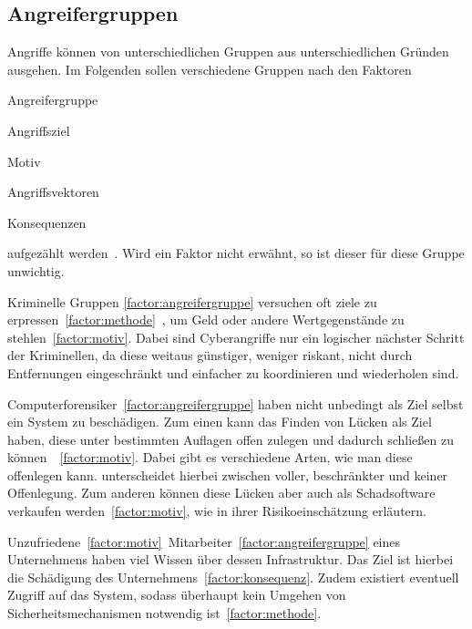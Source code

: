 \documentclass[final,bibliography=totocnumbered]{include/sikseminar}
\begin{document}


    \subsection{Angreifergruppen}
    \label{subsec:angreifergruppen}

    Angriffe können von unterschiedlichen Gruppen aus unterschiedlichen Gründen ausgehen.
    Im Folgenden sollen verschiedene Gruppen nach den Faktoren
    \begin{enumerate*}[label=(\alph*),before=\unskip{: }, itemjoin={{; }}, itemjoin*={{, und }}]
        \item Angreifergruppe\label{factor:angreifergruppe}
        \item Angriffsziel\label{factor:target}
        \item Motiv\label{factor:motiv}
        \item Angriffsvektoren\label{factor:methode}
        \item Konsequenzen\label{factor:konsequenz}
    \end{enumerate*} aufgezählt werden~\cite{HLL+17}.
    Wird ein Faktor nicht erwähnt, so ist dieser für diese Gruppe unwichtig.

    Kriminelle Gruppen \ref{factor:angreifergruppe} versuchen oft ziele zu erpressen~\ref{factor:methode}~\cite{WYX+10}, um Geld oder andere Wertgegenstände zu stehlen~\ref{factor:motiv}.
    Dabei sind Cyberangriffe nur ein logischer nächster Schritt der Kriminellen, da diese weitaus günstiger, weniger riskant, nicht durch Entfernungen eingeschränkt und einfacher zu koordinieren und wiederholen sind. \cite{CAS+09}

    Computerforensiker~\ref{factor:angreifergruppe} haben nicht unbedingt als Ziel selbst ein System zu beschädigen.
    Zum einen kann das Finden von Lücken als Ziel haben, diese unter bestimmten Auflagen offen zulegen und dadurch schließen zu können~\cite{Hahn2012}~\ref{factor:motiv}.
    Dabei gibt es verschiedene Arten, wie man diese offenlegen kann. \citeauthor{Hahn2012} unterscheidet hierbei zwischen voller, beschränkter und keiner Offenlegung.
    Zum anderen können diese Lücken aber auch als Schadsoftware verkaufen werden~\ref{factor:motiv}, wie \citeauthor{Allodi2013} in ihrer Risikoeinschätzung \cite{Allodi2013} erläutern.

    Unzufriedene~\ref{factor:motiv}~Mitarbeiter~\ref{factor:angreifergruppe} eines Unternehmens haben viel Wissen über dessen Infrastruktur.
    Das Ziel ist hierbei die Schädigung des Unternehmens~\ref{factor:konsequenz}.
    Zudem existiert eventuell Zugriff auf das System, sodass überhaupt kein Umgehen von Sicherheitsmechanismen notwendig ist~\ref{factor:methode}.~\cite{CAS+09,WYX+10}
\end{document}
